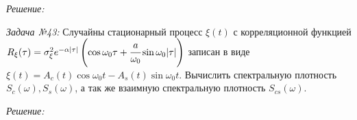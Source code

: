 \documentclass[14pt,final,titlepage,pscyr]{hedwork}
\begin{document}
\emph{Решение:}
\newpage

\emph{Задача №43:} Случайны стационарный процесс \( \xi(t) \) с корреляционной 
функцией 
\( 
    R_\xi(\tau) = \sigma_\xi^2 e^{-\alpha|\tau|} \left( 
        \cos\omega_0\tau + \cfrac{a}{\omega_0}\sin\omega_0|\tau| 
    \right)
\) записан в виде \\ 
\( \xi(t) = A_c(t)\cos\omega_0 t - A_s(t)\sin\omega_0 t \). 
Вычислить спектральную плотность \( S_c(\omega), S_s(\omega) \), а так же 
взаимную спектральную плотность \( S_{cs}(\omega) \).

\emph{Решение:}
\end{document}
